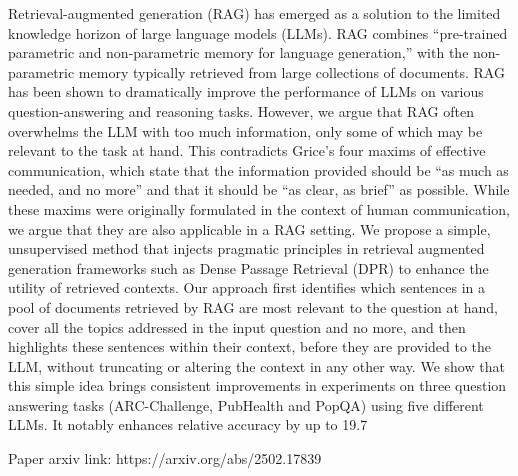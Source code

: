 Retrieval-augmented generation (RAG) has emerged as a solution to the limited knowledge horizon of large language models (LLMs). RAG combines “pre-trained parametric and non-parametric memory for language generation,” with the non-parametric memory typically retrieved from large collections of documents. RAG has been shown to dramatically improve the performance of LLMs on various question-answering and reasoning tasks. However, we argue that RAG often overwhelms the LLM with too much information, only some of which may be relevant to the task at hand. This contradicts Grice’s four maxims of effective communication, which state that the information provided should be “as much as needed, and no more” and that it should be “as clear, as brief” as possible. While these maxims were originally formulated in the context of human communication, we argue that they are also applicable in a RAG setting. We propose a simple, unsupervised method that injects pragmatic principles in retrieval augmented generation frameworks such as Dense Passage Retrieval (DPR) to enhance the utility of retrieved contexts. Our approach first identifies which sentences in a pool of documents retrieved by RAG are most relevant to the question at hand, cover all the topics addressed in the input question and no more, and then highlights these sentences within their context, before they are provided to the LLM, without truncating or altering the context in any other way. We show that this simple idea brings consistent improvements in experiments on three question answering tasks (ARC-Challenge, PubHealth and PopQA) using five different LLMs. It notably enhances relative accuracy by up to 19.7%

Paper arxiv link: https://arxiv.org/abs/2502.17839